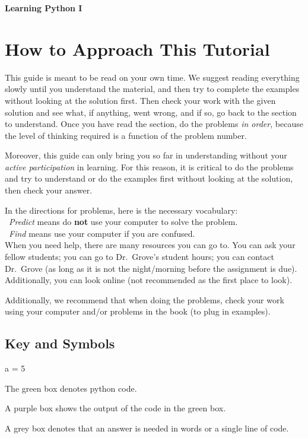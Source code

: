 \documentclass{article}
\begin{document}
\begin{center}
{\LARGE\textbf{Learning Python I}}
\end{center}
\vspace{0.5 cm}
\section{How to Approach This Tutorial}
This guide is meant to be read on your own time. We suggest reading everything slowly until you understand the material, and then try to complete the examples without looking at the solution first. Then check your work with the given solution and see what, if anything, went wrong, and if so, go back to the section to understand. Once you have read the section, do the problems \textit{in order}, because the level of thinking required is a function of the problem number. 

Moreover, this guide can only bring you so far in understanding without your \textit{active participation} in learning. For this reason, it is critical to do the problems and try to understand or do the examples first without looking at the solution, then check your answer.

In the directions for problems, here is the necessary vocabulary:\\
\indent \ \textit{Predict} means do \textbf{not} use your computer to solve the problem.\\
\indent \ \textit{Find} means use your computer if you are confused.\\
When you need help, there are many resources you can go to. You can ask your fellow students; you can go to Dr.~Grove's student hours; you can contact Dr.~Grove (as long as it is not the night/morning before the assignment is due). Additionally, you can look online (not recommended as the first place to look).

Additionally, we recommend that when doing the problems, check your work using your computer and/or problems in the book (to plug in examples).
\subsection{Key and Symbols}
\begin{multicols}{2}
\begin{tcolorbox}[width=.5\textwidth]
	\ttfamily
	a = 5
\end{tcolorbox}
\noindent The green box denotes python code.
\end{multicols}
\begin{multicols}{2}
\begin{tcolorbox}[colback=output, width=.5\textwidth]
	\ttfamily
\end{tcolorbox}
\noindent A purple box shows the output of the code in the green box.
\begin{tcolorbox}[colback=writing, width=.5\textwidth]
	\ttfamily
\end{tcolorbox}
\noindent A grey box denotes that an answer is needed in words or a single line of code.
\end{multicols}
\end{document}
